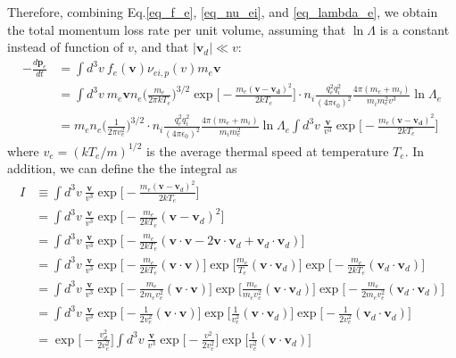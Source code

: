\documentclass{article}
\begin{document}
Therefore, combining Eq.\ref{eq_f_e}, \ref{eq_nu_ei}, and \ref{eq_lambda_e}, we obtain the total momentum loss rate per unit volume, assuming that $\ln \Lambda$ is a constant instead of function of $v$, and that $|\bm{v}_d| \ll v$:
\begin{equation}
	\begin{split}
		-\frac{d \bm{p}_e}{d t} &= \int d^3v\ f_e(\bm{v}) \nu_{ei,p} (v) m_e \bm{v}\\
		&= \int d^3v\ m_e\bm{v} n_e \Big(\frac{m_e}{2\pi kT_e} \Big)^{3/2} \exp\Big[-\frac{m_e(\bm{v} - \bm{v_d})^2}{2kT_e} \Big] \cdot n_i\frac{q_e^2 q_i^2}{(4\pi \epsilon_0 )^2}\frac{4\pi(m_e+m_i)}{m_i m_e^2 v^3} \ln \Lambda_e \\
		&= m_e n_e \Big(\frac{1}{2\pi v_e^2} \Big)^{3/2} \cdot n_i\frac{q_e^2 q_i^2}{(4\pi \epsilon_0 )^2}\frac{4\pi(m_e+m_i)}{m_i m_e^2} \ln \Lambda_e \int d^3v\ \frac{\bm{v}}{v^3} \exp\Big[-\frac{m_e(\bm{v} - \bm{v_d})^2}{2kT_e} \Big] 
	\end{split}
\end{equation}
where $v_e = (kT_e/m )^{1/2}$ is the average thermal speed at temperature $T_e$. In addition, we can define the the integral as
\begin{equation}
	\begin{split}
		I &\equiv \int d^3v\ \frac{\bm{v}}{v^3} \exp\Big[-\frac{m_e(\bm{v} - \bm{v}_d)^2}{2kT_e} \Big] \\
		&= \int d^3v\ \frac{\bm{v}}{v^3} \exp\Big[-\frac{m_e}{2kT_e}(\bm{v} - \bm{v}_d)^2 \Big]\\
		&= \int d^3v\ \frac{\bm{v}}{v^3} \exp\Big[-\frac{m_e}{2kT_e}(\bm{v}\cdot\bm{v} - 2\bm{v}\cdot\bm{v}_d + \bm{v}_d\cdot\bm{v}_d) \Big] \\
		&= \int d^3v\ \frac{\bm{v}}{v^3} \exp\Big[-\frac{m_e}{2kT_e}(\bm{v}\cdot\bm{v}) \Big] \exp\Big[\frac{m_e}{T_e}(\bm{v}\cdot\bm{v}_d ) \Big] \exp\Big[-\frac{m_e}{2kT_e}(\bm{v}_d\cdot\bm{v}_d) \Big] \\
		&= \int d^3v\ \frac{\bm{v}}{v^3} \exp\Big[-\frac{m_e}{2m_ev_e^2}(\bm{v}\cdot\bm{v}) \Big] \exp\Big[\frac{m_e}{m_e v_e^2}(\bm{v}\cdot\bm{v}_d ) \Big] \exp\Big[-\frac{m_e}{2m_ev_e^2}(\bm{v}_d\cdot\bm{v}_d) \Big] \\
		&= \int d^3v\ \frac{\bm{v}}{v^3} \exp\Big[-\frac{1}{2v_e^2}(\bm{v}\cdot\bm{v}) \Big] \exp\Big[\frac{1}{v_e^2}(\bm{v}\cdot\bm{v}_d ) \Big] \exp\Big[-\frac{1}{2v_e^2}(\bm{v}_d\cdot\bm{v}_d) \Big]\\
		&= \exp\Big[-\frac{v_d^2}{2v_e^2} \Big] \int d^3v\ \frac{\bm{v}}{v^3} \exp\Big[-\frac{v^2}{2v_e^2} \Big] \exp\Big[\frac{1}{v_e^2}(\bm{v}\cdot\bm{v}_d ) \Big]
 	\end{split}
\end{equation}
\end{document}
